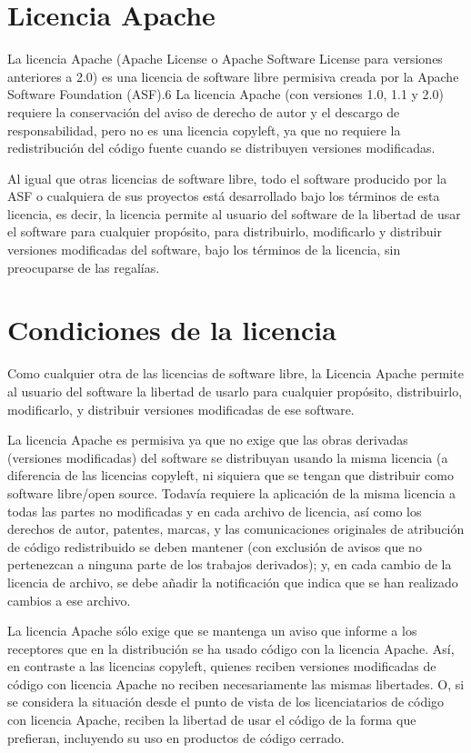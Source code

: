 \section{Licencia Apache}

La licencia Apache (Apache License o Apache Software License para versiones anteriores a 2.0) es una licencia de software libre permisiva creada por la Apache Software Foundation 
(ASF).6 La licencia Apache (con versiones 1.0, 1.1 y 2.0) requiere la conservación del aviso de derecho de autor y el descargo de responsabilidad, pero no es una licencia copyleft, ya que no requiere la redistribución del código fuente cuando se distribuyen versiones modificadas.

Al igual que otras licencias de software libre, todo el software producido por la ASF o cualquiera de sus proyectos está desarrollado bajo los términos de esta licencia, es decir, la licencia permite al usuario del software de la libertad de usar el software para cualquier propósito, para distribuirlo, modificarlo y distribuir versiones modificadas del software, bajo los términos de la licencia, sin preocuparse de las regalías.

\section{Condiciones de la licencia}

Como cualquier otra de las licencias de software libre, la Licencia Apache permite al usuario del software la libertad de usarlo para cualquier propósito, distribuirlo, modificarlo, y distribuir versiones modificadas de ese software.

La licencia Apache es permisiva ya que no exige que las obras derivadas (versiones modificadas) del software se distribuyan usando la misma licencia (a diferencia de las licencias copyleft, ni siquiera que se tengan que distribuir como software libre/open source. Todavía requiere la aplicación de la misma licencia a todas las partes no modificadas y en cada archivo de licencia, así como los derechos de autor, patentes, marcas, y las comunicaciones originales de atribución de código redistribuido se deben mantener (con exclusión de avisos que no pertenezcan a ninguna parte de los trabajos derivados); y, en cada cambio de la licencia de archivo, se debe añadir la notificación que indica que se han realizado cambios a ese archivo.


La licencia Apache sólo exige que se mantenga un aviso que informe a los receptores que en la distribución se ha usado código con la licencia Apache. Así, en contraste a las licencias copyleft, quienes reciben versiones modificadas de código con licencia Apache no reciben necesariamente las mismas libertades. O, si se considera la situación desde el punto de vista de los licenciatarios de código con licencia Apache, reciben la libertad de usar el código de la forma que prefieran, incluyendo su uso en productos de código cerrado.\\


